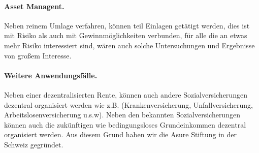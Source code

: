 \paragraph{Asset Managent.} Neben reinem Umlage verfahren, können teil Einlagen getätigt werden, dies ist mit Risiko als auch mit Gewinnmöglichkeiten verbunden, für alle die an etwas mehr Risiko interessiert sind, wären auch solche Untersuchungen und Ergebnisse von großem Interesse.

\paragraph{Weitere Anwendungsfälle.} Neben einer dezentralisierten Rente, können auch andere Sozialversicherungen dezentral organisiert werden wie z.B. (Krankenversicherung, Unfallversicherung, Arbeitslosenversicherung u.s.w). Neben den bekannten Sozialversicherungen können auch die zukünftigen wie bedingungsloses Grundeinkommen dezentral organisiert werden. Aus diesem Grund haben wir die Asure Stiftung in der Schweiz gegründet.

